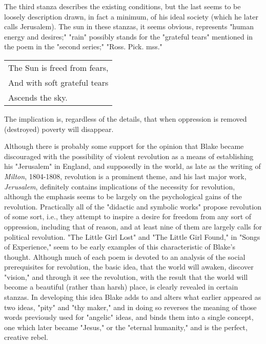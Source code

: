 The third stanza describes the existing conditions, but the last seems to be loosely description drawn, in fact
a minimum, of his ideal society (which he later calls Jerusalem). The sun in these stanzas, it seems obvious, represents 
"human energy and desires;" "rain" possibly stands for the "grateful tears" mentioned in the poem in the "second series;"
"Ross. Pick. mss."\par
\begin{center}
	\begin{tabular}{l}
		The Sun is freed from fears, \\
		And with soft grateful tears \\
		Ascends the sky.
	\end{tabular}
\end{center}
\hspace*{5mm}The implication is, regardless of the details, that when oppression
is removed (destroyed) poverty will disappear.\par
\vspace*{0.5\baselineskip}
Although there is probably some support for the opinion that Blake became discouraged with the
possibility of violent revolution as a means of establishing his "Jerusalem" in England, and supposedly
in the world, as late as the writing of \textit{Milton}, 1804-1808, revolution is a prominent theme, and his
last major work, \textit{Jerusalem}, definitely contains implications of the necessity for revolution,
although the emphasis seems to be largely on the psychological gains of the revolution. Practically all of 
the "didactic and symbolic works" propose revolution of some sort, i.e., they attempt to inspire a desire
for freedom from any sort of oppression, including that of reason, and at least nine of them are largely
calls for political revolution. "The Little Girl Lost" and "The Little Girl Found," in "Songs of Experience," seem
to be early examples of this characteristic of Blake's thought. Although much of each poem is devoted to an analysis
of the social prerequisites for revolution, the basic idea, that the world will awaken, discover "vision," and
through it see the revolution, with the result that the world will become a beautiful (rather than harsh) place,
is clearly revealed in certain stanzas. In developing this idea Blake adds to and alters what earlier
appeared as two ideas, "pity" and "thy maker," and in doing so reverses the meaning of those words previously
used for "angelic" ideas, and binds them into a single concept, one which later became "Jesus," or the 
"eternal humanity," and is the perfect, creative rebel.\par

